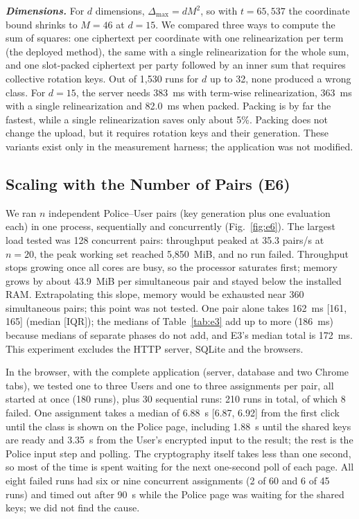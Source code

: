 \documentclass[conference,letterpaper]{IEEEtran}
\begin{document}
\textbf{\textit{Dimensions.}} For $d$ dimensions, $\Delta_{\max} = dM^2$, so with $t = 65{,}537$ the coordinate bound shrinks to $M = 46$ at $d = 15$. We compared three ways to compute the sum of squares: one ciphertext per coordinate with one relinearization per term (the deployed method), the same with a single relinearization for the whole sum, and one slot-packed ciphertext per party followed by an inner sum that requires collective rotation keys. Out of 1,530 runs for $d$ up to 32, none produced a wrong class. For $d = 15$, the server needs 383~ms with term-wise relinearization, 363~ms with a single relinearization and 82.0~ms when packed. Packing is by far the fastest, while a single relinearization saves only about 5\%. Packing does not change the upload, but it requires rotation keys and their generation. These variants exist only in the measurement harness; the application was not modified.

\subsection{Scaling with the Number of Pairs (E6)}\label{sec:e6}
We ran $n$ independent Police--User pairs (key generation plus one evaluation each) in one process, sequentially and concurrently (Fig.~\ref{fig:e6}). The largest load tested was 128 concurrent pairs: throughput peaked at 35.3 pairs/s at $n = 20$, the peak working set reached 5,850~MiB, and no run failed. Throughput stops growing once all cores are busy, so the processor saturates first; memory grows by about 43.9~MiB per simultaneous pair and stayed below the installed RAM. Extrapolating this slope, memory would be exhausted near 360 simultaneous pairs; this point was not tested. One pair alone takes 162~ms [161, 165] (median [IQR]); the medians of Table~\ref{tab:e3} add up to more (186~ms) because medians of separate phases do not add, and E3's median total is 172~ms. This experiment excludes the HTTP server, SQLite and the browsers.

In the browser, with the complete application (server, database and two Chrome tabs), we tested one to three Users and one to three assignments per pair, all started at once (180 runs), plus 30 sequential runs: 210 runs in total, of which 8 failed. One assignment takes a median of 6.88~s [6.87, 6.92] from the first click until the class is shown on the Police page, including 1.88~s until the shared keys are ready and 3.35~s from the User's encrypted input to the result; the rest is the Police input step and polling. The cryptography itself takes less than one second, so most of the time is spent waiting for the next one-second poll of each page. All eight failed runs had six or nine concurrent assignments (2 of 60 and 6 of 45 runs) and timed out after 90~s while the Police page was waiting for the shared keys; we did not find the cause.
\end{document}
